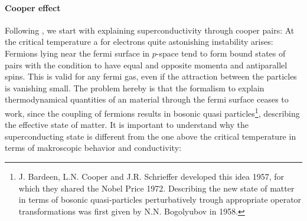 \paragraph{Cooper effect} Following \cite{Landau}, we start with explaining superconductivity through
cooper pairs: At the critical temperature a for electrons quite astonishing instability arises: Fermions lying 
near the fermi surface in $p$-space tend to form bound states of pairs with the condition to have equal and
opposite momenta and antiparallel spins. This is valid for any fermi gas, even if the attraction between the
particles is vanishing small. The problem hereby is that the formalism to explain thermodynamical quantities 
of an material through the fermi surface ceases to work, since the coupling of fermions results in bosonic quasi
particles\footnote{J. Bardeen, L.N. Cooper and J.R. Schrieffer developed this idea 1957, for which
they shared the Nobel Price 1972. Describing the new state of matter in terms of bosonic quasi-particles perturbatively 
trough appropriate operator transformations was first given by N.N. Bogolyubov in 1958.}, 
describing the effective state of matter. It is important to understand why the superconducting state 
is different from the one above the critical temperature in terms of makroscopic behavior and conductivity:
